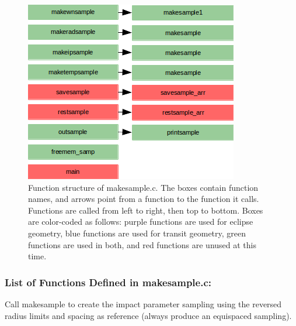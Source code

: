 \documentclass[letterpaper,12pt]{article}
\begin{document}
\begin{figure}
\includegraphics{fig/makesamplec}
\caption{Function structure of makesample.c. The boxes contain function names, and arrows point from a function to the function it calls. Functions are called from left to right, then top to bottom.  Boxes are color-coded as follows:  purple functions are used for eclipse geometry, blue functions are used for transit geometry, green functions are used in both, and red functions are unused at this time.}
\label{fig:makesamplec}
\end{figure}

\subsubsection{List of Functions Defined in makesample.c:}
 \newline

 \newline

 \newline

 \newline

Call makesample to create the impact parameter sampling using the
reversed radius limits and spacing as reference (always produce an
equispaced sampling). \newline
\end{document}
